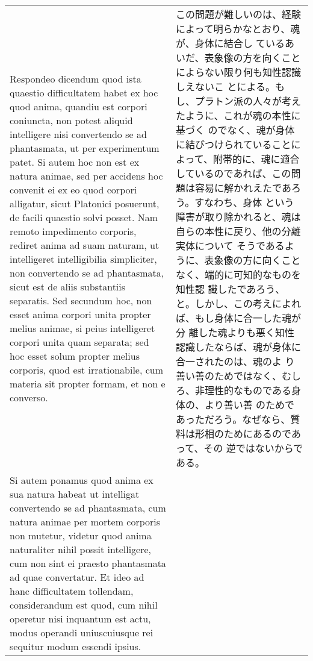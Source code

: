 \documentclass[10pt]{jsarticle} %
\begin{document}
\begin{longtable}{p{21em}p{21em}}
{\sc Respondeo dicendum quod} ista quaestio difficultatem habet ex hoc
quod anima, quandiu est corpori coniuncta, non potest aliquid
intelligere nisi convertendo se ad phantasmata, ut per experimentum
patet. Si autem hoc non est ex natura animae, sed per accidens hoc
convenit ei ex eo quod corpori alligatur,
sicut Platonici posuerunt, de facili quaestio solvi posset. Nam remoto
impedimento corporis, rediret anima ad suam naturam, ut intelligeret
intelligibilia simpliciter, non convertendo se ad phantasmata, sicut
est de aliis substantiis separatis. Sed secundum hoc, non esset anima
corpori unita propter melius animae, si peius intelligeret corpori
unita quam separata; sed hoc esset solum propter melius corporis, quod
est irrationabile, cum materia sit propter formam, et non e converso.

& この問題が難しいのは、経験によって明らかなとおり、魂が、身体に結合し
ているあいだ、表象像の方を向くことによらない限り何も知性認識しえないこ
とによる。もし、プラトン派の人々が考えたように、これが魂の本性に基づく
のでなく、魂が身体に結びつけられていることによって、附帯的に、魂に適合
しているのであれば、この問題は容易に解かれえたであろう。すなわち、身体
という障害が取り除かれると、魂は自らの本性に戻り、他の分離実体について
そうであるように、表象像の方に向くことなく、端的に可知的なものを知性認
識したであろう、と。しかし、この考えによれば、もし身体に合一した魂が分
離した魂よりも悪く知性認識したならば、魂が身体に合一されたのは、魂のよ
り善い善のためではなく、むしろ、非理性的なものである身体の、より善い善
のためであっただろう。なぜなら、質料は形相のためにあるのであって、その
逆ではないからである。

\\

Si autem ponamus quod anima ex sua natura habeat ut intelligat
convertendo se ad phantasmata, cum natura animae per mortem corporis
non mutetur, videtur quod anima naturaliter nihil possit intelligere,
cum non sint ei praesto
phantasmata ad quae convertatur. Et ideo ad hanc difficultatem
tollendam, considerandum est quod, cum nihil operetur nisi inquantum
est actu, modus operandi uniuscuiusque rei sequitur modum essendi
ipsius.


\end{longtable}
\end{document}
